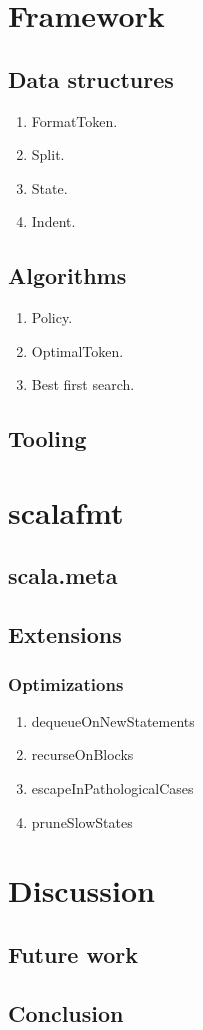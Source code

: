 \documentclass[11pt,a4paper]{article}
\begin{document}
\section{Framework}
\subsection{Data structures}
\begin{enumerate}
  \item FormatToken.
  \item Split.
  \item State.
  \item Indent.
\end{enumerate}
\subsection{Algorithms}
\begin{enumerate}
  \item Policy.
  \item OptimalToken.
  \item Best first search.
\end{enumerate}
\subsection{Tooling}
\section{scalafmt}
\subsection{scala.meta}
\subsection{Extensions}
\subsubsection{Optimizations}
\begin{enumerate}
  \item dequeueOnNewStatements
  \item recurseOnBlocks
  \item escapeInPathologicalCases
  \item pruneSlowStates
\end{enumerate}
\section{Discussion}
\subsection{Future work}
\subsection{Conclusion}
\printbibliography{}
\end{document}
